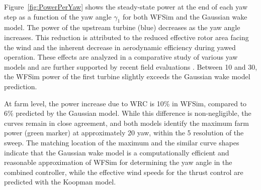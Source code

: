 Figure~\ref{fig:PowerPerYaw} shows the steady-state power at the end of each yaw step as a function of the yaw angle $\gamma_1$ for both WFSim and the Gaussian wake model. The power of the upstream turbine (blue) decreases as the yaw angle increases. This reduction is attributed to the reduced effective rotor area facing the wind and the inherent decrease in aerodynamic efficiency during yawed operation. These effects are analyzed in a comparative study of various yaw models \cite{sant2016comparing} and are further supported by recent field evaluations \cite{hulsman2022turbine}. Between 10\textdegree{} and 30\textdegree{}, the WFSim power of the first turbine slightly exceeds the Gaussian wake model prediction.

At farm level, the power increase due to WRC is 10\% in WFSim, compared to 6\% predicted by the Gaussian model. While this difference is non-negligible, the curves remain in close agreement, and both models identify the maximum farm power (green marker) at approximately 20\textdegree{} yaw, within the 5\textdegree{} resolution of the sweep. The matching location of the maximum and the similar curve shapes indicate that the Gaussian wake model is a computationally efficient and reasonable approximation of WFSim for determining the yaw angle in the combined controller, while the effective wind speeds for the thrust control are predicted with the Koopman model.


